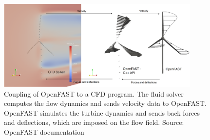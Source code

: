 \begin{figure}[h]
	\centering
	\includegraphics[width=0.9\textwidth]{images/openfast-coupling-scheme.png}
	\caption{Coupling of OpenFAST to a CFD program. The fluid solver computes the flow dynamics and sends velocity data to OpenFAST. OpenFAST simulates the turbine dynamics and sends back forces and deflections, which are imposed on the flow field. Source: OpenFAST documentation\protect\footnotemark}
	\label{fig:openfast:coupling}
\end{figure}


